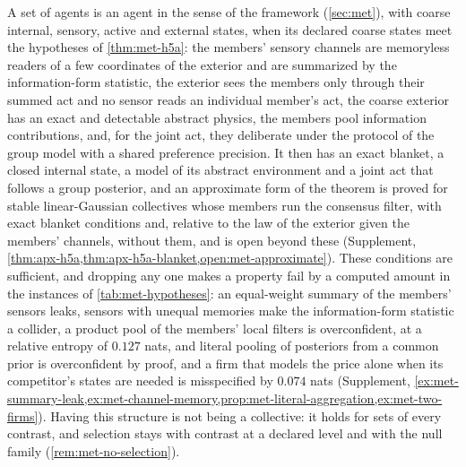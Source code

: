 A set of agents is an agent in the sense of the framework (\cref{sec:met}), with coarse internal, sensory, active and external states, when its declared coarse states meet the hypotheses of \cref{thm:met-h5a}: the members' sensory channels are memoryless readers of a few coordinates of the exterior and are summarized by the information-form statistic, the exterior sees the members only through their summed act and no sensor reads an individual member's act, the coarse exterior has an exact and detectable abstract physics, the members pool information contributions, and, for the joint act, they deliberate under the protocol of the group model with a shared preference precision. It then has an exact blanket, a closed internal state, a model of its abstract environment and a joint act that follows a group posterior, and an approximate form of the theorem is proved for stable linear-Gaussian collectives whose members run the consensus filter, with exact blanket conditions and, relative to the law of the exterior given the members' channels, without them, and is open beyond these (Supplement, \cref{thm:apx-h5a,thm:apx-h5a-blanket,open:met-approximate}). These conditions are sufficient, and dropping any one makes a property fail by a computed amount in the instances of \cref{tab:met-hypotheses}: an equal-weight summary of the members' sensors leaks, sensors with unequal memories make the information-form statistic a collider, a product pool of the members' local filters is overconfident, at a relative entropy of $0.127$ nats, and literal pooling of posteriors from a common prior is overconfident by proof, and a firm that models the price alone when its competitor's states are needed is misspecified by $0.074$ nats (Supplement, \cref{ex:met-summary-leak,ex:met-channel-memory,prop:met-literal-aggregation,ex:met-two-firms}). Having this structure is not being a collective: it holds for sets of every contrast, and selection stays with contrast at a declared level and with the null family (\cref{rem:met-no-selection}).

